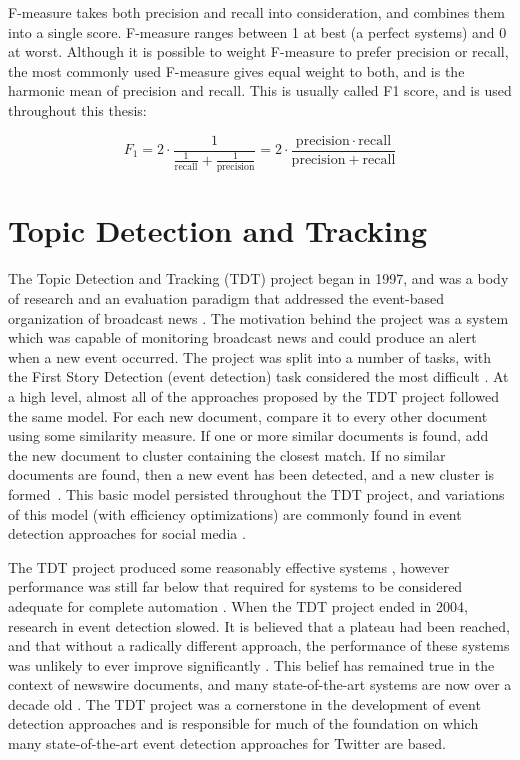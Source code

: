 F-measure takes both precision and recall into consideration, and combines them into a single score. F-measure ranges between 1 at best (a perfect systems) and 0 at worst. Although it is possible to weight F-measure to prefer precision or recall, the most commonly used F-measure gives equal weight to both, and is the harmonic mean of precision and recall. This is usually called F1 score, and is used throughout this thesis:

\begin{displaymath}
	F_1 = 2 \cdot \frac{1}{\tfrac{1}{\mathrm{recall}} + \tfrac{1}{\mathrm{precision}}} = 2 \cdot \frac{\mathrm{precision} \cdot \mathrm{recall}}{\mathrm{precision} + \mathrm{recall}}
\end{displaymath}

\section{Topic Detection and Tracking}
The Topic Detection and Tracking (TDT) project began in 1997, and was a body of research and an evaluation paradigm that addressed the event-based organization of broadcast news \citep{Allan:2002:ITD:772260.772262}. The motivation behind the project was a system which was capable of monitoring broadcast news and could produce an alert when a new event occurred. The project was split into a number of tasks, with the First Story Detection (event detection) task considered the most difficult \citep{Allan:2000:FSD:354756.354843}. At a high level, almost all of the approaches proposed by the TDT project followed the same model. For each new document, compare it to every other document using some similarity measure. If one or more similar documents is found, add the new document to cluster containing the closest match. If no similar documents are found, then a new event has been detected, and a new cluster is formed~\citep{Allan:2000:FSD:354756.354843}. This basic model persisted throughout the TDT project, and variations of this model (with efficiency optimizations) are commonly found in event detection approaches for social media \citep{becker2011beyond,Petrovic:2010:SFS:1857999.1858020,aggarwalevent,conf/asunam/OzdikisSO12}.

The TDT project produced some reasonably effective systems \citep{UMASS,Yang98,Allan:2005:TTD:1042435.1042899}, however performance was still far below that required for systems to be considered adequate for complete automation \citep{Allan:2000:FSD:354756.354843}. When the TDT project ended in 2004, research in event detection slowed. It is believed that a plateau had been reached, and that without a radically different approach, the performance of these systems was unlikely to ever improve significantly \citep{Allan:2000:FSD:354756.354843}. This belief has remained true in the context of newswire documents, and many state-of-the-art systems are now over a decade old \citep{UMASS,Yang98,Allan:2005:TTD:1042435.1042899}. The TDT project was a cornerstone in the development of event detection approaches and is responsible for much of the foundation on which many state-of-the-art event detection approaches for Twitter are based.

